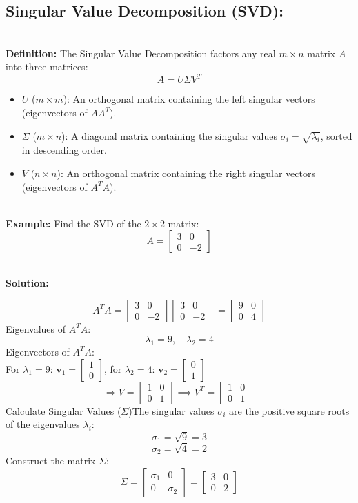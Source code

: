 \documentclass[DIV=20,oneside]{scrartcl}
\newcommand{\solution}{
	\noindent\textbf{\\Solution: }
}
\newcommand{\example}{
	\noindent\textbf{\\Example: }
}
\newcommand{\deff}{
	\noindent\textbf{\\Definition: }
}
\begin{document}
\begin{itemize}
	\subsection{Singular Value Decomposition (SVD):}
	\deff The Singular Value Decomposition factors any real $m \times n$ matrix $A$ into three matrices:$$A = U \Sigma V^T$$
	\begin{itemize}
		\item $U$ ($m \times m$): An orthogonal matrix containing the left singular vectors (eigenvectors of $A A^T$).
		\item $\Sigma$ ($m \times n$): A diagonal matrix containing the singular values $\sigma_i = \sqrt{\lambda_i}$, sorted in descending order.
		\item $V$ ($n \times n$): An orthogonal matrix containing the right singular vectors (eigenvectors of $A^T A$).
	\end{itemize}
	\example Find the SVD of the $2 \times 2$ matrix:$$A = \begin{bmatrix} 3 & 0 \\ 0 & -2 \end{bmatrix}$$
	\solution
	$$A^T A = \begin{bmatrix} 3 & 0 \\ 0 & -2 \end{bmatrix} \begin{bmatrix} 3 & 0 \\ 0 & -2 \end{bmatrix} = \begin{bmatrix} 9 & 0 \\ 0 & 4 \end{bmatrix}$$
	Eigenvalues of $A^T A$: $$\lambda_1 = 9, \quad \lambda_2 = 4$$
	Eigenvectors of $A^T A$:\\
	For $\lambda_1 = 9$: $\mathbf{v}_1 = \begin{bmatrix} 1 \\ 0 \end{bmatrix}$, 
	for $\lambda_2 = 4$: $\mathbf{v}_2 = \begin{bmatrix} 0 \\ 1 \end{bmatrix}$
	$$\Rightarrow V = \begin{bmatrix} 1 & 0 \\ 0 & 1 \end{bmatrix} \implies V^T = \begin{bmatrix} 1 & 0 \\ 0 & 1 \end{bmatrix}$$
	Calculate Singular Values ($\Sigma$)The singular values $\sigma_i$ are the positive square roots of the eigenvalues $\lambda_i$:$$\sigma_1 = \sqrt{9} = 3$$$$\sigma_2 = \sqrt{4} = 2$$Construct the matrix $\Sigma$:$$\Sigma = \begin{bmatrix} \sigma_1 & 0 \\ 0 & \sigma_2 \end{bmatrix} = \begin{bmatrix} 3 & 0 \\ 0 & 2 \end{bmatrix}$$

\end{itemize}
\end{document}
